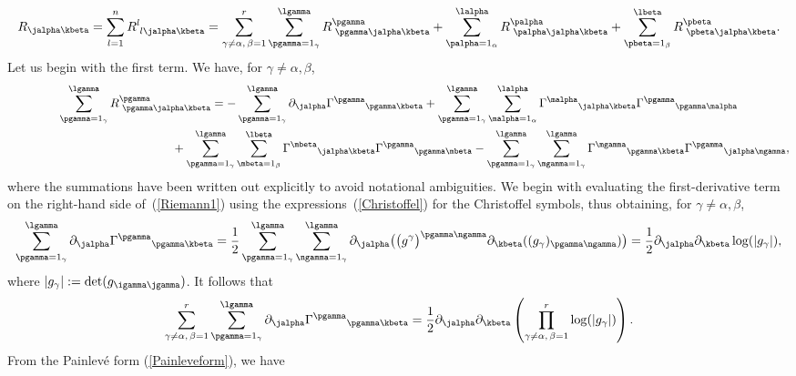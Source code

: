 \begin{gather}\label{Riccidecomp}
R_{\jalpha \kbeta}=\sum_{l=1}^{n}R^{l}_{{\phantom l} l \jalpha \kbeta}=\sum_{\gamma \neq \alpha,\, \beta=1}^{r}\sum_{\pgamma=1_{\gamma}}^{\lgamma}R^{\pgamma}_{{\phantom l} \pgamma \jalpha \kbeta} + \sum_{\palpha =1_{\alpha}}^{\lalpha}R^{\palpha}_{{\phantom l} \palpha \jalpha \kbeta}+\sum_{\pbeta=1_{\beta}}^{\lbeta}R^{\pbeta}_{{\phantom l} \pbeta \jalpha \kbeta}.
\end{gather}
Let us begin with the first term. We have, for $\gamma\neq \alpha, \beta$,
\begin{gather}
\sum_{\pgamma = 1_{\gamma}}^{\lgamma}R^{\pgamma}_{{\phantom l} \pgamma \jalpha \kbeta}=-\sum_{\pgamma = 1_{\gamma}}^{\lgamma}\partial_{\jalpha}{\Gamma^{\pgamma}}_{\pgamma \kbeta} +\sum_{\pgamma = 1_{\gamma}}^{\lgamma}\sum_{\malpha=1_{\alpha}}^{\lalpha}{\Gamma^{\malpha}}_{\jalpha \kbeta}{\Gamma^{\pgamma}}_{\pgamma \malpha}\nonumber\\
\hphantom{\sum_{\pgamma = 1_{\gamma}}^{\lgamma}R^{\pgamma}_{{\phantom l} \pgamma \jalpha \kbeta}=}{}
+\sum_{\pgamma = 1_{\gamma}}^{\lgamma}\sum_{\mbeta=1_{\beta}}^{\lbeta}{\Gamma^{\mbeta}}_{\jalpha \kbeta}{\Gamma^{\pgamma}}_{\pgamma \mbeta} -\sum_{\pgamma = 1_{\gamma}}^{\lgamma}\sum_{\mgamma=1_{\gamma}}^{\lgamma}{\Gamma^{\mgamma}}_{\pgamma \kbeta}{\Gamma^{\pgamma}}_{\jalpha \mgamma},\label{Riemann1}
\end{gather}
where the summations have been written out explicitly to avoid notational ambiguities. We begin with evaluating the first-derivative term on the right-hand side of~(\ref{Riemann1}) using the expressions~(\ref{Christoffel}) for the Christoffel symbols, thus obtaining, for $\gamma \neq \alpha, \beta$,
\begin{gather}\label{derivgamma}
\sum_{\pgamma = 1_{\gamma}}^{\lgamma}\partial_{\jalpha}{\Gamma^{\pgamma}}_{\pgamma \kbeta} = \frac{1}{2}\sum_{\pgamma = 1_{\gamma}}^{\lgamma}\sum_{\ngamma = 1_{\gamma}}^{\lgamma}\partial_{\jalpha}\big(\big(g^{\gamma}\big)^{\pgamma \ngamma}\partial_{\kbeta}((g_{\gamma})_{\pgamma \ngamma})\big)=\frac{1}{2}\partial_{\jalpha}\partial_{\kbeta}\log(|g_{\gamma}|),
\end{gather}
where $|g_{\gamma}|:=\det(g_{\igamma \jgamma})$. It follows that
\[
\sum_{\gamma \neq \alpha,\, \beta=1}^{r}\sum_{\pgamma=1_{\gamma}}^{\lgamma}\partial_{\jalpha}{\Gamma^{\pgamma}}_{\pgamma \kbeta}= \frac{1}{2}\partial_{\jalpha}\partial_{\kbeta}\left(\prod_{\gamma \neq \alpha, \,\beta=1}^{r}\log(|g_{\gamma}|)\right).
\]
From the Painlev\'e form (\ref{Painleveform}), we have
